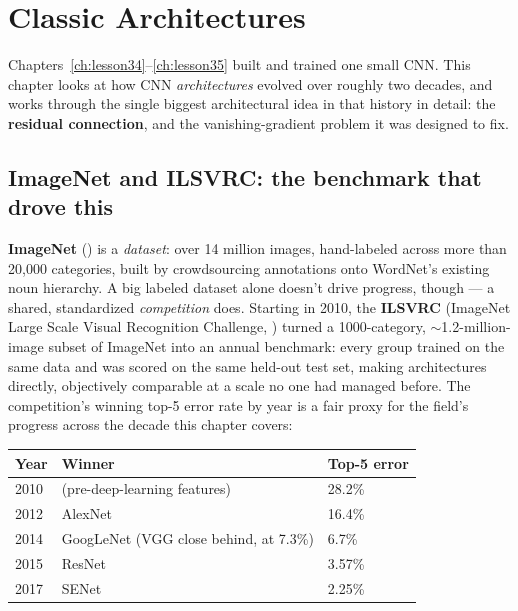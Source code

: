 \chapter{Classic Architectures}
\label{ch:lesson37}

Chapters~\ref{ch:lesson34}--\ref{ch:lesson35} built and trained one small CNN. This chapter looks at how CNN \emph{architectures} evolved over roughly two decades, and works through the single biggest architectural idea in that history in detail: the \textbf{residual connection}, and the vanishing-gradient problem it was designed to fix.

\section{ImageNet and ILSVRC: the benchmark that drove this}

\textbf{ImageNet} () is a \emph{dataset}: over 14 million images, hand-labeled across more than 20,000 categories, built by crowdsourcing annotations onto WordNet's existing noun hierarchy. A big labeled dataset alone doesn't drive progress, though --- a shared, standardized \emph{competition} does. Starting in 2010, the \textbf{ILSVRC} (ImageNet Large Scale Visual Recognition Challenge, ) turned a 1000-category, $\sim$1.2-million-image subset of ImageNet into an annual benchmark: every group trained on the same data and was scored on the same held-out test set, making architectures directly, objectively comparable at a scale no one had managed before. The competition's winning top-5 error rate by year is a fair proxy for the field's progress across the decade this chapter covers:

\begin{center}
\renewcommand{\arraystretch}{1.3}
\begin{tabular}{lll}
\hline
\textbf{Year} & \textbf{Winner} & \textbf{Top-5 error} \\
\hline
2010 & (pre-deep-learning features)     & 28.2\% \\
2012 & AlexNet                          & 16.4\% \\
2014 & GoogLeNet (VGG close behind, at 7.3\%) & 6.7\% \\
2015 & ResNet                           & 3.57\% \\
2017 & SENet                            & 2.25\% \\
\hline
\end{tabular}
\end{center}

